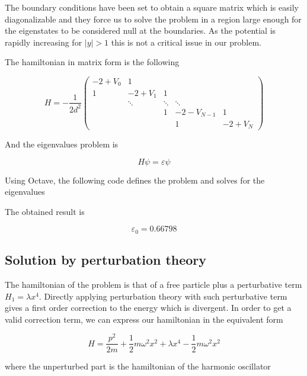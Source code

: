\documentclass{article}
\begin{document}
The boundary conditions have been set to obtain a square matrix which is easily diagonalizable and they force us to solve the problem in a region large enough for the eigenstates to be considered null at the boundaries. As the potential is rapidly increasing for \( |y| > 1 \) this is not a critical issue in our problem.

The hamiltonian in matrix form is the following

\begin{equation}
H = -\frac{1}{2d^2}
  \begin{pmatrix}
    -2+V_0 & 1 &&& \\
    1 & -2+V_1 & 1 && \\
    & \ddots & \ddots & \ddots & \\
    && 1 & -2-V_{N-1} & 1 \\
    &&& 1 & -2+V_N
  \end{pmatrix}
\end{equation}

And the eigenvalues problem is

\begin{equation}
H\psi = \varepsilon \psi
\end{equation}

Using Octave, the following code defines the problem and solves for the eigenvalues



The obtained result is

\begin{equation}
\varepsilon_0 = 0.66798
\end{equation}

\subsection{Solution by perturbation theory}
The hamiltonian of the problem is that of a free particle plus a perturbative term \( H_1 = \lambda x^4 \). Directly applying perturbation theory with such perturbative term gives a first order correction to the energy which is divergent. In order to get a valid correction term, we can express our hamiltonian in the equivalent form

\begin{equation}
H = \frac{p^2}{2m} + \frac{1}{2}m\omega^2x^2 + \lambda x^4 - \frac{1}{2}m\omega^2 x^2
\end{equation}

where the unperturbed part is the hamiltonian of the harmonic oscillator
\end{document}
